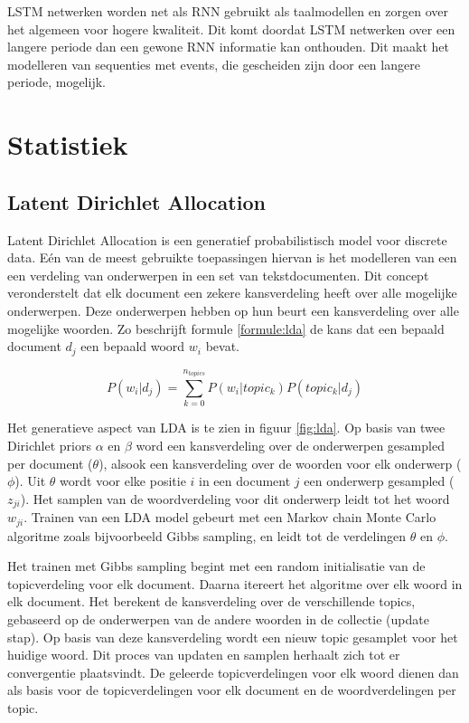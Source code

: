 LSTM netwerken worden net als RNN gebruikt als taalmodellen en zorgen over het algemeen voor hogere kwaliteit. Dit komt doordat LSTM netwerken over een langere periode dan een gewone RNN informatie kan onthouden. Dit maakt het modelleren van sequenties met events, die gescheiden zijn door een langere periode, mogelijk.


\section{Statistiek}

\subsection{Latent Dirichlet Allocation}
Latent Dirichlet Allocation\cite{Blei2012} is een generatief probabilistisch model voor discrete data. E\'en van de meest gebruikte toepassingen hiervan is het modelleren van een een verdeling van onderwerpen in een set van tekstdocumenten. Dit concept veronderstelt dat elk document een zekere kansverdeling heeft over alle mogelijke onderwerpen. Deze onderwerpen hebben op hun beurt een kansverdeling over alle mogelijke woorden. Zo beschrijft formule \ref{formule:lda} de kans dat een bepaald document $d_j$ een bepaald woord $w_i$ bevat. 

\begin{equation}
    P(w_i | d_j) = \sum\limits_{k=0}^{n_{topics}}P(w_i|topic_k)P(topic_k|d_j)
    \label{formule:lda}
\end{equation}

Het generatieve aspect van LDA is te zien in figuur \ref{fig:lda}. Op basis van twee Dirichlet priors $\alpha$ en $\beta$ word een kansverdeling over de onderwerpen gesampled per document ($\theta$), alsook een kansverdeling over de woorden voor elk onderwerp ($\phi$). Uit $\theta$ wordt voor elke positie $i$ in een document $j$ een onderwerp gesampled ($z_{ji}$). Het samplen van de woordverdeling voor dit onderwerp leidt tot het woord $w_{ji}$. Trainen van een LDA model gebeurt met een Markov chain Monte Carlo algoritme zoals bijvoorbeeld Gibbs sampling, en leidt tot de verdelingen $\theta$ en $\phi$.

Het trainen met Gibbs sampling begint met een random initialisatie van de topicverdeling voor elk document. Daarna itereert het algoritme over elk woord in elk document. Het berekent de kansverdeling over de verschillende topics, gebaseerd op de onderwerpen van de andere woorden in de collectie (update stap). Op basis van deze kansverdeling wordt een nieuw topic gesamplet voor het huidige woord. Dit proces van updaten en samplen herhaalt zich tot er convergentie plaatsvindt. De geleerde topicverdelingen voor elk woord dienen dan als basis voor de topicverdelingen voor elk document en de woordverdelingen per topic.

